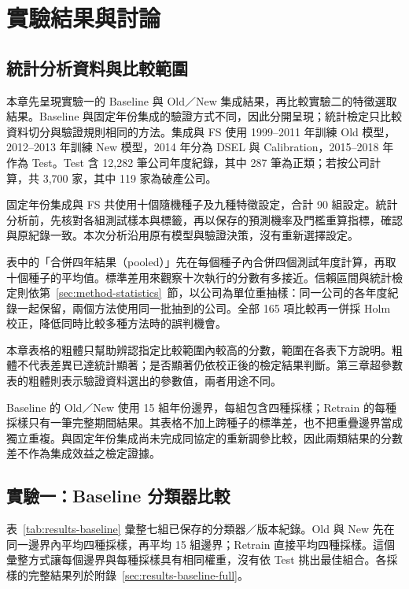\chapter{實驗結果與討論}\label{chap:results}
\begingroup
\setlength{\emergencystretch}{2em}

\section{統計分析資料與比較範圍}

本章先呈現實驗一的 Baseline 與 Old／New 集成結果，再比較實驗二的特徵選取結果。Baseline 與固定年份集成的驗證方式不同，因此分開呈現；統計檢定只比較資料切分與驗證規則相同的方法。集成與 FS 使用 1999--2011 年訓練 Old 模型，2012--2013 年訓練 New 模型，2014 年分為 DSEL 與 Calibration，2015--2018 年作為 Test。Test 含 12,282 筆公司年度紀錄，其中 287 筆為正類；若按公司計算，共 3,700 家，其中 119 家為破產公司。

固定年份集成與 FS 共使用十個隨機種子及九種特徵設定，合計 90 組設定。統計分析前，先核對各組測試樣本與標籤，再以保存的預測機率及門檻重算指標，確認與原紀錄一致。本次分析沿用原有模型與驗證決策，沒有重新選擇設定。

表中的「合併四年結果（pooled）」先在每個種子內合併四個測試年度計算，再取十個種子的平均值。標準差用來觀察十次執行的分數有多接近。信賴區間與統計檢定則依第~\ref{sec:method-statistics}~節，以公司為單位重抽樣：同一公司的各年度紀錄一起保留，兩個方法使用同一批抽到的公司。全部 165 項比較再一併採 Holm 校正，降低同時比較多種方法時的誤判機會。

本章表格的粗體只幫助辨認指定比較範圍內較高的分數，範圍在各表下方說明。粗體不代表差異已達統計顯著；是否顯著仍依校正後的檢定結果判斷。第三章超參數表的粗體則表示驗證資料選出的參數值，兩者用途不同。

Baseline 的 Old／New 使用 15 組年份邊界，每組包含四種採樣；Retrain 的每種採樣只有一筆完整期間結果。其表格不加上跨種子的標準差，也不把重疊邊界當成獨立重複。與固定年份集成尚未完成同協定的重新調參比較，因此兩類結果的分數差不作為集成效益之檢定證據。

\section{實驗一：Baseline 分類器比較}\label{sec:results-baseline}

表~\ref{tab:results-baseline} 彙整七組已保存的分類器／版本紀錄。Old 與 New 先在同一邊界內平均四種採樣，再平均 15 組邊界；Retrain 直接平均四種採樣。這個彙整方式讓每個邊界與每種採樣具有相同權重，沒有依 Test 挑出最佳組合。各採樣的完整結果列於附錄~\ref{sec:results-baseline-full}。

